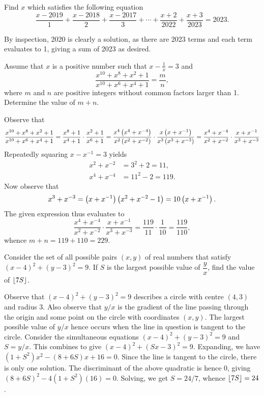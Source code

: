 \begin{question}[2020]\label{Q::2023-O-1-12}
    Find $x$ which satisfies the following equation \[\dfrac{x-2019}{1} + \dfrac{x-2018}{2} + \dfrac{x-2017}{3} + \cdots + \dfrac{x+2}{2022} + \dfrac{x+3}{2023} = 2023.\]
\end{question}
\begin{solution*}
    By inspection, 2020 is clearly a solution, as there are 2023 terms and each term evaluates to 1, giving a sum of 2023 as desired.
\end{solution*}

\begin{question}[229]\label{Q::2023-O-1-13}
    Assume that $x$ is a positive number such that $x - \frac1x = 3$ and \[\dfrac{x^{10} + x^8 + x^2 + 1}{x^{10} + x^6 + x^4 + 1} = \dfrac{m}{n},\] where $m$ and $n$ are positive integers without common factors larger than 1. Determine the value of $m + n$.
\end{question}
\begin{solution*}
    Observe that \[\frac{x^{10} + x^8 + x^2 + 1}{x^{10} + x^6 + x^4 + 1} = \frac{x^8 + 1}{x^4 + 1} \cdot \frac{x^2+1}{x^6+1} = \frac{x^4\left( x^4 + x^{-4} \right)}{x^2\left( x^2 + x^{-2} \right)} \cdot \frac{x\left( x+x^{-1} \right)}{x^3\left( x^3+x^{-3} \right)} = \frac{x^4 + x^{-4}}{x^2 + x^{-2}} \cdot \frac{x+x^{-1}}{x^3+x^{-3}}\]
    Repeatedly squaring $x - x^{-1} = 3$ yields
    \begin{align*}
        x^2 + x^{-2} &= 3^2 + 2 = 11,\\
        x^4 + x^{-4} &= 11^2 - 2 = 119.
    \end{align*}
    Now observe that \[x^3 + x^{-3} = \left( x + x^{-1} \right)\left( x^2 + x^{-2} - 1 \right) = 10\left( x + x^{-1} \right).\] The given expression thus evaluates to \[\frac{x^4 + x^{-4}}{x^2 + x^{-2}} \cdot \frac{x+x^{-1}}{x^3+x^{-3}} = \frac{119}{11} \cdot \frac1{10} = \frac{119}{110},\] whence $m + n = 119 + 110 = 229$.
\end{solution*}

\begin{question}[24]\label{Q::2023-O-1-14}
    Consider the set of all possible pairs $(x, y)$ of real numbers that satisfy $(x-4)^2 + (y-3)^2 = 9$. If $S$ is the largest possible value of $\dfrac{y}{x}$, find the value of $\left\lfloor 7S \right\rfloor$.
\end{question}
\begin{solution*}
    Observe that $(x-4)^2 + (y-3)^2 = 9$ describes a circle with centre $(4, 3)$ and radius 3. Also observe that $y/x$ is the gradient of the line passing through the origin and some point on the circle with coordinates $(x, y)$. The largest possible value of $y/x$ hence occurs when the line in question is tangent to the circle. Consider the simultaneous equations $(x-4)^2 + (y-3)^2 = 9$ and $S = y/x$. This combines to give $(x-4)^2 + (Sx - 3)^2 = 9$. Expanding, we have $(1+S^2)x^2 - (8+6S)x + 16 = 0$. Since the line is tangent to the circle, there is only one solution. The discriminant of the above quadratic is hence 0, giving $(8+6S)^2 - 4(1+S^2)(16) = 0$. Solving, we get $S = 24/7$, whence $\left\lfloor 7S \right\rfloor = 24$.
\end{solution*}


